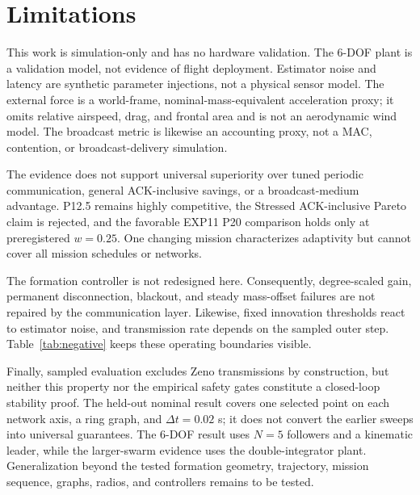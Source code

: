 \section{Limitations}
\label{sec:limitations}

This work is simulation-only and has no hardware validation. The 6-DOF plant
is a validation model, not evidence of flight deployment. Estimator noise and
latency are synthetic parameter injections, not a physical sensor model. The
external force is a world-frame, nominal-mass-equivalent acceleration proxy;
it omits relative airspeed, drag, and frontal area and is not an aerodynamic
wind model. The broadcast metric is likewise an accounting proxy, not a MAC,
contention, or broadcast-delivery simulation.

The evidence does not support universal superiority over tuned periodic
communication, general ACK-inclusive savings, or a broadcast-medium advantage.
P12.5 remains highly competitive, the Stressed ACK-inclusive Pareto claim is
rejected, and the favorable EXP11 P20 comparison holds only at preregistered
$w=0.25$. One changing mission characterizes adaptivity but cannot cover all
mission schedules or networks.

The formation controller is not redesigned here. Consequently, degree-scaled
gain, permanent disconnection, blackout, and steady mass-offset failures are
not repaired by the communication layer. Likewise, fixed innovation thresholds
react to estimator noise, and transmission rate depends on the sampled outer
step. Table~\ref{tab:negative} keeps these operating boundaries visible.

Finally, sampled evaluation excludes Zeno transmissions by construction, but
neither this property nor the empirical safety gates constitute a closed-loop
stability proof. The held-out nominal result covers one selected point on each
network axis, a ring graph, and $\Delta t=0.02$ s; it does not convert the
earlier sweeps into universal guarantees. The 6-DOF result uses $N=5$
followers and a kinematic leader, while the larger-swarm evidence uses the
double-integrator plant. Generalization beyond the tested formation geometry,
trajectory, mission sequence, graphs, radios, and controllers remains to be
tested.
